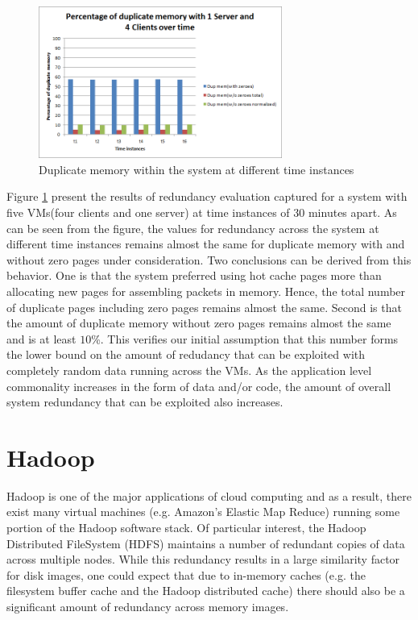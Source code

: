 \documentclass{acm_proc_article-sp}
\begin{document}
\begin{figure}[htbp]
\centering
        \includegraphics[width=8cm]{images/client-server2.png}
    \caption{Duplicate memory within the system at different time instances}
    \label{fig:client-server2}
\end{figure}

Figure \ref{fig:client-server2} present the results of redundancy evaluation captured for a system with five VMs(four clients and one server) at time instances of 30 minutes apart. As can be seen from the figure, the values for redundancy across the system at different time instances remains almost the same for duplicate memory with and without zero pages under consideration. Two conclusions can be derived from this behavior. One is that the system preferred using hot cache pages more than allocating new pages for assembling packets in memory. Hence, the total number of duplicate pages including zero pages remains almost the same. Second is that the amount of duplicate memory without zero pages remains almost the same and is at least $10$\%. This verifies our initial assumption that this number forms the lower bound on the amount of redudancy that can be exploited with completely random data running across the VMs. As the application level commonality increases in the form of data and/or code, the amount of overall system redundancy that can be exploited also increases.


\section{Hadoop}
Hadoop is one of the major applications of cloud computing and as a result, there exist many virtual machines (e.g. Amazon's Elastic Map Reduce) running some portion of the Hadoop software stack.  Of particular interest, the Hadoop Distributed FileSystem (HDFS) maintains a number of redundant copies of data across multiple nodes.  While this redundancy results in a large similarity factor for disk images, one could expect that due to in-memory caches (e.g. the filesystem buffer cache and the Hadoop distributed cache) there should also be a significant amount of redundancy across memory images.  
\end{document}
